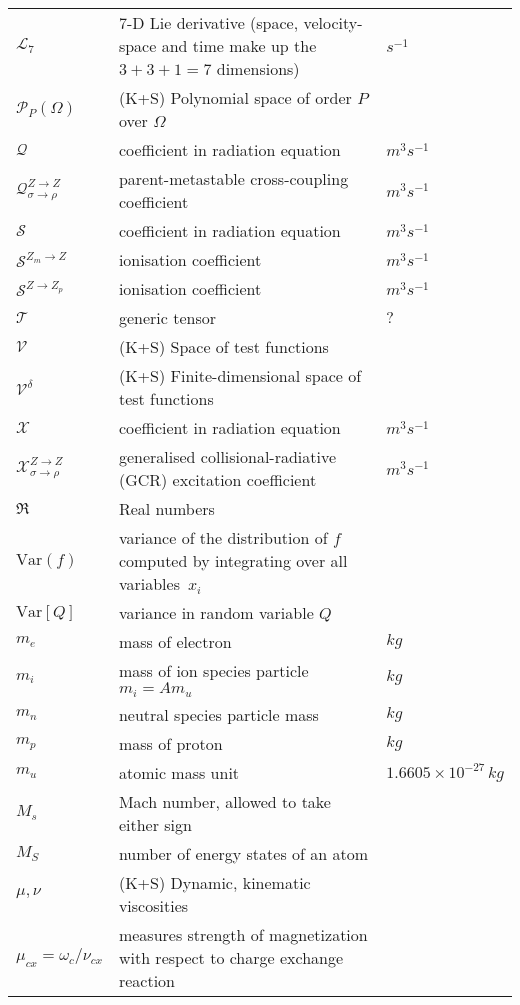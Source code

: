 \begin{longtable}{|p{3.0cm}|p{10.0cm}|p{3.0cm}|}
$\mathcal{L}_7$ & 7-D Lie derivative (space, velocity-space and time make up the $3+3+1=7$ dimensions)  & $s^{-1}$ \\
$\mathcal{P}_{P}(\Omega)$ &  (K+S) Polynomial space of order $P$ over $\Omega$ & \\
$\mathcal{Q}$ & coefficient in radiation equation  & $m^3 s^{-1}$ \\
$\mathcal{Q}_{\sigma \rightarrow \rho}^{Z\rightarrow Z}$ & parent-metastable cross-coupling coefficient  & $m^3 s^{-1}$ \\
$\mathcal{S}$ & coefficient in radiation equation  & $m^3 s^{-1}$ \\
$\mathcal{S}^{Z_m\rightarrow Z}$ & ionisation coefficient  & $m^3 s^{-1}$ \\
$\mathcal{S}^{Z\rightarrow Z_p}$ & ionisation coefficient  & $m^3 s^{-1}$ \\
$\mathcal{T}$ & generic tensor & $?$ \\
$\mathcal{V}$ &  (K+S) Space of test functions & \\
$\mathcal{V}^{\delta}$ &  (K+S) Finite-dimensional space of test functions & \\
$\mathcal{X}$ & coefficient in radiation equation  & $m^3 s^{-1}$ \\
$\mathcal{X}_{\sigma \rightarrow \rho}^{Z\rightarrow Z}$ & generalised collisional-radiative (GCR) excitation coefficient  & $m^3 s^{-1}$ \\
$\mathfrak{R}$ & Real numbers & \\
$\mathrm{Var}(f)$ & variance of the distribution of $f$ computed by integrating over all variables~$x_i$  & \\
$\mathrm{Var}[Q]$ & variance in random variable $Q$  & \\
$m_e$ & mass of electron & $kg$ \\
$m_i$ & mass of ion species particle $m_i= A m_u$ & $kg$ \\
$m_n$ & neutral species particle mass & $kg$ \\
$m_p$ & mass of proton & $kg$ \\
$m_u$ & atomic mass unit & $1.6605 \times 10^{-27}\,kg$ \\
$M_s$ & Mach number, allowed to take either sign & \\
$M_S$ & number of energy states of an atom & \\
$\mu, \nu$ &  (K+S) Dynamic, kinematic viscosities & \\
$\mu_{cx}=\omega_c/\nu_{cx}$ & measures strength of magnetization with respect to charge exchange reaction & \\

\end{longtable}
